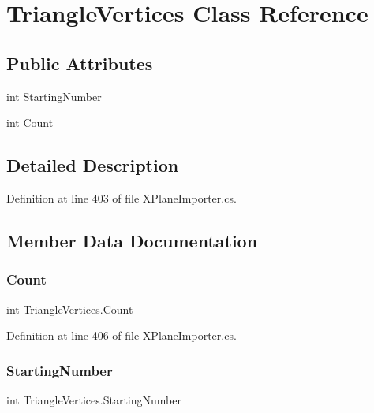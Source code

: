 \hypertarget{class_triangle_vertices}{}\section{Triangle\+Vertices Class Reference}
\label{class_triangle_vertices}
\subsection*{Public Attributes}
\begin{DoxyCompactItemize}
\item 
int \mbox{\hyperlink{class_triangle_vertices_a463b0b57c16239ba1104b7240e5f33e5}{Starting\+Number}}
\item 
int \mbox{\hyperlink{class_triangle_vertices_a174eac8f7a3e07fcfefa321f1ae02e8d}{Count}}
\end{DoxyCompactItemize}


\subsection{Detailed Description}


Definition at line 403 of file X\+Plane\+Importer.\+cs.



\subsection{Member Data Documentation}
\mbox{\label{class_triangle_vertices_a174eac8f7a3e07fcfefa321f1ae02e8d}} 
\subsubsection{\texorpdfstring{Count}{Count}}
{\footnotesize\ttfamily int Triangle\+Vertices.\+Count}



Definition at line 406 of file X\+Plane\+Importer.\+cs.

\mbox{\label{class_triangle_vertices_a463b0b57c16239ba1104b7240e5f33e5}} 
\subsubsection{\texorpdfstring{StartingNumber}{StartingNumber}}
{\footnotesize\ttfamily int Triangle\+Vertices.\+Starting\+Number}



